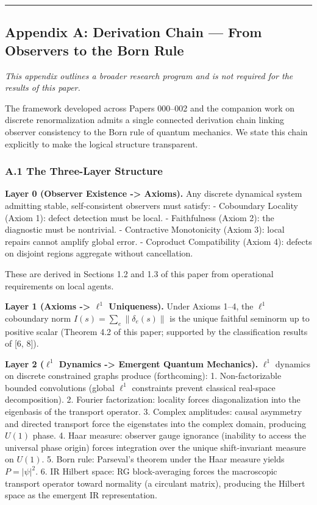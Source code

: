 \documentclass[
]{article}
\begin{document}
\begin{center}\rule{0.5\linewidth}{0.5pt}\end{center}

\subsection{Appendix A: Derivation Chain --- From Observers to the Born
Rule}\label{appendix-a-derivation-chain-from-observers-to-the-born-rule}

\emph{This appendix outlines a broader research program and is not
required for the results of this paper.}

The framework developed across Papers 000--002 and the companion work on
discrete renormalization admits a single connected derivation chain
linking observer consistency to the Born rule of quantum mechanics. We
state this chain explicitly to make the logical structure transparent.

\subsubsection{A.1 The Three-Layer
Structure}\label{a.1-the-three-layer-structure}

\textbf{Layer 0 (Observer Existence -\textgreater{} Axioms).} Any
discrete dynamical system admitting stable, self-consistent observers
must satisfy: - Coboundary Locality (Axiom 1): defect detection must be
local. - Faithfulness (Axiom 2): the diagnostic must be nontrivial. -
Contractive Monotonicity (Axiom 3): local repairs cannot amplify global
error. - Coproduct Compatibility (Axiom 4): defects on disjoint regions
aggregate without cancellation.

These are derived in Sections 1.2 and 1.3 of this paper from operational
requirements on local agents.

\textbf{Layer 1 (Axioms -\textgreater{} \(\ell^1\) Uniqueness).} Under
Axioms 1--4, the \(\ell^1\) coboundary norm
\(I(s) = \sum_e \|\delta_e(s)\|\) is the unique faithful seminorm up to
positive scalar (Theorem 4.2 of this paper; supported by the
classification results of {[}6, 8{]}).

\textbf{Layer 2 (\(\ell^1\) Dynamics -\textgreater{} Emergent Quantum
Mechanics).} \(\ell^1\) dynamics on discrete constrained graphs produce
(forthcoming): 1. Non-factorizable bounded convolutions (global
\(\ell^1\) constraints prevent classical real-space decomposition). 2.
Fourier factorization: locality forces diagonalization into the
eigenbasis of the transport operator. 3. Complex amplitudes: causal
asymmetry and directed transport force the eigenstates into the complex
domain, producing \(U(1)\) phase. 4. Haar measure: observer gauge
ignorance (inability to access the universal phase origin) forces
integration over the unique shift-invariant measure on \(U(1)\). 5. Born
rule: Parseval's theorem under the Haar measure yields \(P = |\psi|^2\).
6. IR Hilbert space: RG block-averaging forces the macroscopic transport
operator toward normality (a circulant matrix), producing the Hilbert
space as the emergent IR representation.
\end{document}
